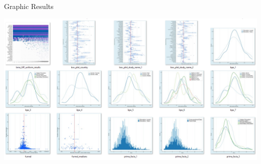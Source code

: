 \documentclass{beamer} %
\begin{document}


\begin{frame}{Graphic Results}
    \begin{center}
        \includegraphics[width=1\textwidth]{Figures/graphical_results.png}
    \end{center}
\end{frame}
\end{document}
